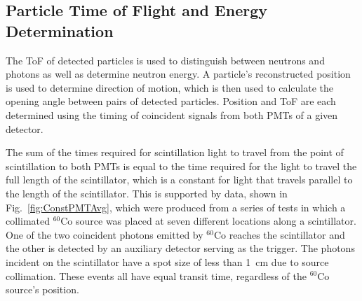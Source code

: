 \subsection{Particle Time of Flight and Energy Determination}
\label{ToF_reconstruction}
The ToF of detected particles is used to distinguish between neutrons and photons as well as determine neutron energy.
A particle's reconstructed position is used to determine direction of motion, which is then used to calculate the opening angle between pairs of detected particles.
Position and ToF are each determined using the timing of coincident signals from both PMTs of a given detector.

The sum of the times required for scintillation light to travel from the point of scintillation to both PMTs is equal to the time required for the light to travel the full length of the scintillator, which is a constant for light that travels parallel to the length of the scintillator.
This is supported by data, shown in Fig.~\ref{fig:ConstPMTAvg}, which were produced from a series of tests in which a collimated $^{60}$Co source was placed at seven different locations along a scintillator.
One of the two coincident photons emitted by $^{60}$Co reaches the scintillator and the other is detected by an auxiliary detector serving as the trigger. 
The photons incident on the scintillator have a spot size of less than 1~cm due to source collimation.
These events all have equal transit time, regardless of the $^{60}$Co source's position. %

